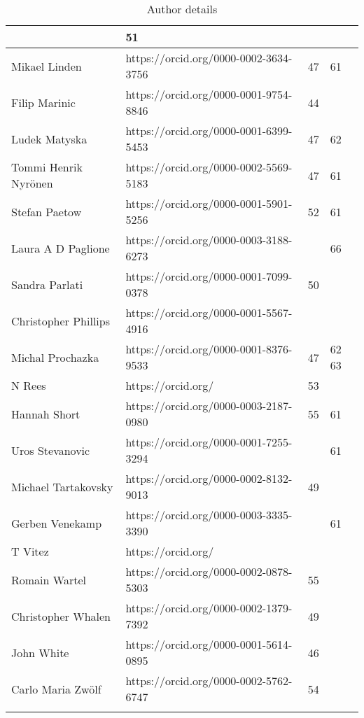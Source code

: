 \begin{center}
\begin{longtable}{|p{5cm}|C{6cm}|C{2cm}|C{2.5cm}|}
&51
&\\
\hline
Mikael Linden
&https://orcid.org/0000-0002-3634-3756
&47
&61\\
\hline
Filip Marinic
&https://orcid.org/0000-0001-9754-8846
&44
&\\
\hline
Ludek Matyska
&https://orcid.org/0000-0001-6399-5453
&47
&62\\
\hline
Tommi Henrik Nyr\"{o}nen
&https://orcid.org/0000-0002-5569-5183
&47
&61\\
\hline
Stefan Paetow
&https://orcid.org/0000-0001-5901-5256
&52
&61\\
\hline
Laura A D Paglione
&https://orcid.org/0000-0003-3188-6273
&
&66\\
\hline
Sandra Parlati
&https://orcid.org/0000-0001-7099-0378
&50
&\\
\hline
Christopher Phillips
&https://orcid.org/0000-0001-5567-4916
&
&\\
\hline
Michal Prochazka
&https://orcid.org/0000-0001-8376-9533
&47
&62 63\\
\hline
N Rees
&https://orcid.org/
&53
&\\
\hline
Hannah Short
&https://orcid.org/0000-0003-2187-0980
&55
&61\\
\hline
Uros Stevanovic
&https://orcid.org/0000-0001-7255-3294
&
&61\\
\hline
Michael Tartakovsky
&https://orcid.org/0000-0002-8132-9013
&49
&\\
\hline
Gerben Venekamp
&https://orcid.org/0000-0003-3335-3390
&
&61\\
\hline
T Vitez
&https://orcid.org/
&
&\\
\hline
Romain Wartel
&https://orcid.org/0000-0002-0878-5303
&55
&\\
\hline
Christopher Whalen
&https://orcid.org/0000-0002-1379-7392
&49
&\\
\hline
John White
&https://orcid.org/0000-0001-5614-0895
&46
&\\
\hline
Carlo Maria Zw\"{o}lf
&https://orcid.org/0000-0002-5762-6747
&54
&\\
\hline
                                       
\hline
\caption{Author details}
\label{tab:authors}
\end{longtable}



\end{center}
